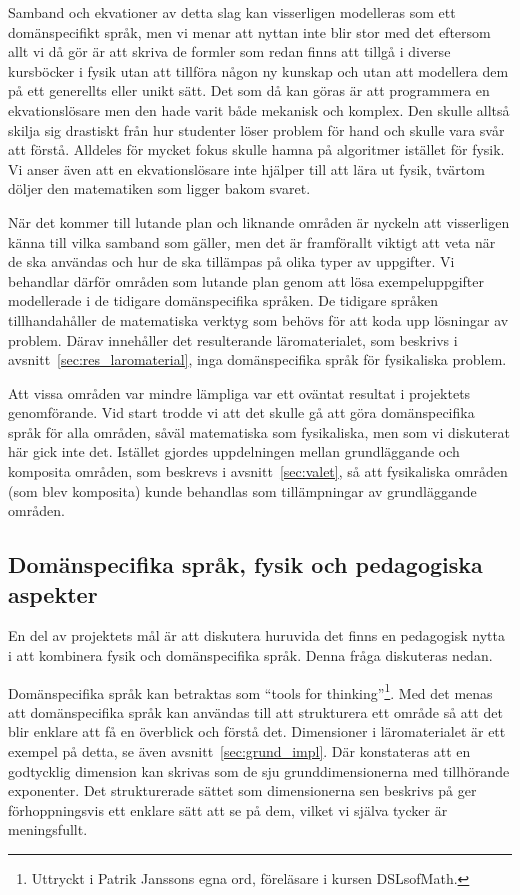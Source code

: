 Samband och ekvationer av detta slag kan visserligen modelleras som ett domänspecifikt
språk, men vi menar att nyttan inte blir stor med det eftersom allt vi då gör är
att skriva de formler som redan finns att tillgå i diverse kursböcker i fysik
utan att tillföra någon ny kunskap och utan att modellera dem på ett generellts
eller unikt sätt. Det som då kan göras är att programmera en ekvationslösare men
den hade varit både mekanisk och komplex. Den skulle alltså skilja sig
drastiskt från hur studenter löser problem för hand och skulle vara svår att förstå.
Alldeles för mycket fokus skulle hamna på algoritmer istället för fysik. Vi
anser även att en ekvationslösare inte hjälper till att lära ut fysik, tvärtom
döljer den matematiken som ligger bakom svaret.

När det kommer till lutande plan och liknande områden är nyckeln att visserligen
känna till vilka samband som gäller, men det är framförallt viktigt att veta när de ska
användas och hur de ska tillämpas på olika typer av uppgifter. Vi behandlar
därför områden som lutande plan genom att lösa exempeluppgifter modellerade i de
tidigare domänspecifika språken. De tidigare språken tillhandahåller de matematiska
verktyg som behövs för att koda upp lösningar av problem. Därav innehåller det
resulterande läromaterialet, som beskrivs i avsnitt~\ref{sec:res_laromaterial},
inga domänspecifika språk för fysikaliska problem.

Att vissa områden var mindre lämpliga var ett oväntat resultat i projektets
genomförande. Vid start trodde vi att det skulle gå att göra domänspecifika
språk för alla områden, såväl matematiska som fysikaliska, men som vi
diskuterat här gick inte det. Istället gjordes uppdelningen mellan grundläggande och
komposita områden, som beskrevs i avsnitt~\ref{sec:valet}, så att fysikaliska
områden (som blev komposita) kunde behandlas som tillämpningar av
grundläggande områden.

\subsection{Domänspecifika språk, fysik och pedagogiska aspekter}\label{sec:bara_fysik}

En del av projektets mål är att diskutera huruvida det finns en pedagogisk nytta
i att kombinera fysik och domänspecifika språk. Denna fråga diskuteras nedan.

Domänspecifika språk kan betraktas som ``tools for thinking''\footnote{Uttryckt
i Patrik Janssons egna ord, föreläsare i kursen DSLsofMath.}. Med det
menas att domänspecifika språk kan användas till att strukturera ett område så
att det blir enklare att få en överblick och
förstå det. Dimensioner i läromaterialet är ett exempel på
detta, se även avsnitt~\ref{sec:grund_impl}. Där konstateras att en godtycklig
dimension kan skrivas som de sju grunddimensionerna med tillhörande exponenter.
Det strukturerade sättet som dimensionerna sen beskrivs på ger förhoppningsvis
ett enklare sätt att se på dem, vilket vi själva tycker är meningsfullt.

